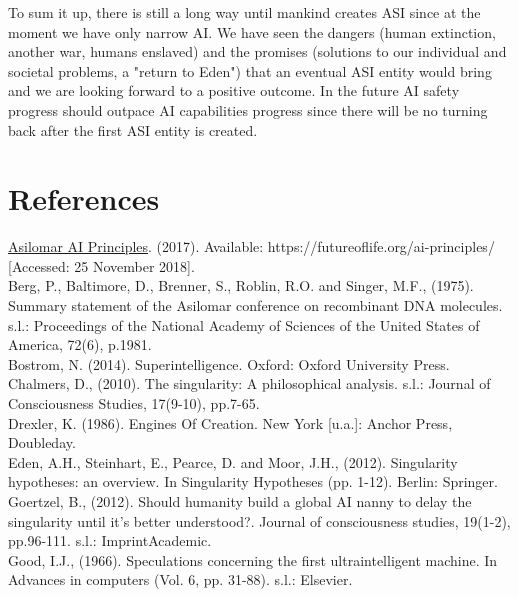 \documentclass[11pt]{article}
\begin{document}
\indent 
	To sum it up, there is still a long way until  mankind creates ASI since at the moment we have only narrow AI. We have seen the dangers (human extinction, another war, humans enslaved) and the promises (solutions to our individual and societal problems, a "return to Eden") that an eventual ASI entity would bring and we are looking forward to a positive outcome.
In the future AI safety progress should outpace AI capabilities progress since there will be no turning back after the first ASI entity is created.\\


\newpage

\section*{References}

\underline{Asilomar AI Principles}. (2017). Available: https://futureoflife.org/ai-principles/ [Accessed: 25 November 2018].\\

Berg, P., Baltimore, D., Brenner, S., Roblin, R.O. and Singer, M.F., (1975). Summary statement of the Asilomar conference on recombinant DNA molecules. s.l.: Proceedings of the National Academy of Sciences of the United States of America, 72(6), p.1981.\\

Bostrom, N. (2014). Superintelligence. Oxford: Oxford University Press.\\

Chalmers, D., (2010). The singularity: A philosophical analysis. s.l.: Journal of Consciousness Studies, 17(9-10), pp.7-65.\\

Drexler, K. (1986). Engines Of Creation. New York [u.a.]: Anchor Press, Doubleday.\\

Eden, A.H., Steinhart, E., Pearce, D. and Moor, J.H., (2012). Singularity hypotheses: an overview. In Singularity Hypotheses (pp. 1-12). Berlin: Springer.\\

Goertzel, B., (2012). Should humanity build a global AI nanny to delay the singularity until it’s better understood?. Journal of consciousness studies, 19(1-2), pp.96-111. s.l.: ImprintAcademic.\\

Good, I.J., (1966). Speculations concerning the first ultraintelligent machine. In Advances in computers (Vol. 6, pp. 31-88). s.l.: Elsevier.\\
\end{document}
